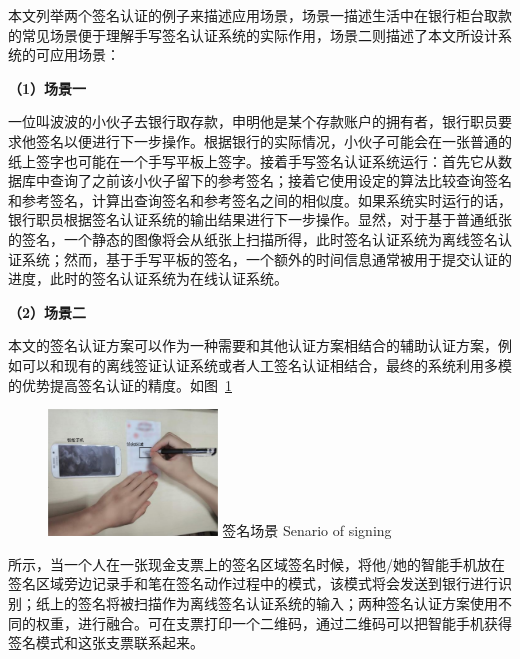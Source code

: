本文列举两个签名认证的例子来描述应用场景，场景一描述生活中在银行柜台取款的常见场景便于理解手写签名认证系统的实际作用，场景二则描述了本文所设计系统的可应用场景：

\textbf{（1）场景一}

一位叫波波的小伙子去银行取存款，申明他是某个存款账户的拥有者，银行职员要求他签名以便进行下一步操作。根据银行的实际情况，小伙子可能会在一张普通的纸上签字也可能在一个手写平板上签字。接着手写签名认证系统运行：首先它从数据库中查询了之前该小伙子留下的参考签名；接着它使用设定的算法比较查询签名和参考签名，计算出查询签名和参考签名之间的相似度。如果系统实时运行的话，银行职员根据签名认证系统的输出结果进行下一步操作。显然，对于基于普通纸张的签名，一个静态的图像将会从纸张上扫描所得，此时签名认证系统为离线签名认证系统；然而，基于手写平板的签名，一个额外的时间信息通常被用于提交认证的进度，此时的签名认证系统为在线认证系统。

\textbf{（2）场景二}

本文的签名认证方案可以作为一种需要和其他认证方案相结合的辅助认证方案，例如可以和现有的离线签证认证系统或者人工签名认证相结合，最终的系统利用多模的优势提高签名认证的精度。如图~\ref{fig:sign-senario}
\begin{figure}[!htp]
  \centering
  \includegraphics[width=0.4\textwidth]{figure/acoustic-senario.pdf}
  \bicaption
    {签名场景}
    {Senario of signing}
  \label{fig:sign-senario}
\end{figure}
所示，当一个人在一张现金支票上的签名区域签名时候，将他/她的智能手机放在签名区域旁边记录手和笔在签名动作过程中的模式，该模式将会发送到银行进行识别；纸上的签名将被扫描作为离线签名认证系统的输入；两种签名认证方案使用不同的权重，进行融合。可在支票打印一个二维码，通过二维码可以把智能手机获得签名模式和这张支票联系起来。


